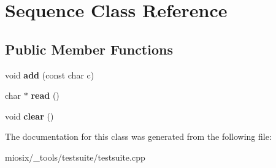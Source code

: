 \hypertarget{class_sequence}{\section{Sequence Class Reference}
\label{class_sequence}
}
\subsection*{Public Member Functions}
\begin{DoxyCompactItemize}
\item 
\hypertarget{class_sequence_ac04c716cc2a271ec05ca0a00a000a144}{void {\bfseries add} (const char c)}\label{class_sequence_ac04c716cc2a271ec05ca0a00a000a144}

\item 
\hypertarget{class_sequence_a8a78cb48aeb477c1d4c4c98e93354664}{char $\ast$ {\bfseries read} ()}\label{class_sequence_a8a78cb48aeb477c1d4c4c98e93354664}

\item 
\hypertarget{class_sequence_a4891f86fec65088d1bc4846fc32035a5}{void {\bfseries clear} ()}\label{class_sequence_a4891f86fec65088d1bc4846fc32035a5}

\end{DoxyCompactItemize}


The documentation for this class was generated from the following file\-:\begin{DoxyCompactItemize}
\item 
miosix/\-\_\-tools/testsuite/testsuite.\-cpp\end{DoxyCompactItemize}
